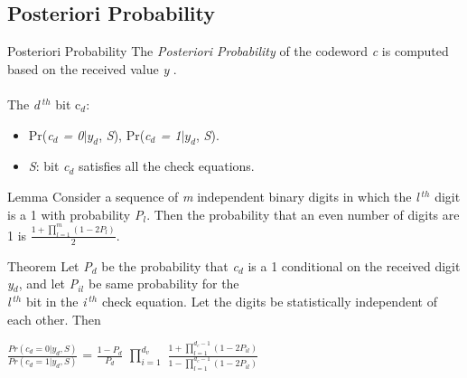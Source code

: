 \documentclass{beamer}
\newcommand{\xieti}{\textsl}
\begin{document}
\subsection{Posteriori Probability}
\begin{frame}
    \begin{block}{Posteriori Probability}
        The \xieti{Posteriori Probability} of the codeword \xieti{c} is
        computed based on the received value \xieti{y} .\\
        \quad \\
        \quad The \xieti{d$^{\;th}$} bit c$_d$:
        \begin{itemize}
        \item Pr(\xieti{c$_d$ = 0}$|y_d$, \xieti{S}), Pr(\xieti{c$_d$ = 1}$|y_d$, \xieti{S}).
        \item \xieti{S}: bit \xieti{c$_d$} satisfies all the check equations.
        \end{itemize}
    \end{block}
\end{frame}
\begin{frame}
    \begin{block}{Lemma}
        Consider a sequence of \xieti{m} independent binary digits in
        which the \xieti{l$^{\;th}$} digit is a 1 with probability
        \xieti{P$_l$}. Then the probability that an even number of
        digits are 1 is $\frac{1 + \prod_{l=1}^{m}{(1-2P_l)}}{2}$.
    \end{block}
\end{frame}
\begin{frame}
    \begin{block}{Theorem}
        Let \xieti{P$_d$} be the probability that \xieti{c$_d$} is a 1 conditional on
        the received digit \xieti{y$_d$}, and let \xieti{P$_{il}$} be same probability
        for the \\\xieti{l$^{\; th}$} bit in the \xieti{i$^{\; th}$} check equation. Let
        the digits be statistically independent of each other. Then\\
        \begin{center}
        $\frac{Pr(c_d = 0|y_d, S)}{Pr(c_d = 1|y_d, S)}$ = $\frac{1-P_d}{P_d}$
        $\prod_{i=1}^{d_v}$
        $\frac{1+\prod_{l=1}^{d_c-1}(1-2P_{il})}{1-\prod_{l=1}^{d_c-1}(1-2P_{il})}$
        \end{center}
    \end{block}
\end{frame}
\end{document}
